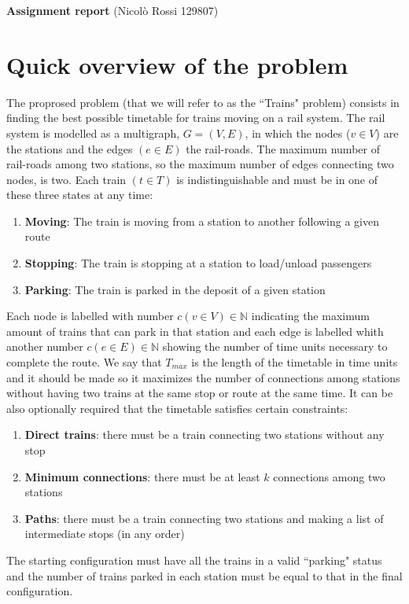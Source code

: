 \documentclass[11pt]{article}
\begin{document}
\newtheorem{Definizione}{Definizione}
\newtheorem{Lemma}{Lemma}
\newtheorem{Teorema}{Teorema}
\textbf{Assignment report} (Nicolò Rossi 129807)
\tableofcontents
\newpage
\section{Quick overview of the problem}
The proprosed problem (that we will refer to as the ``Trains" problem) consists in finding the best possible timetable for trains moving on a rail system. 
The rail system is modelled as a multigraph, $G=(V,E)$, in which the nodes ($v\in V$) are the stations and the edges $(e\in E)$ the rail-roads. The maximum number of rail-roads among two stations, so the maximum number of edges connecting two nodes, is two.
Each train $(t \in T)$ is indistinguishable and must be in one of these three states at any time:
\begin{enumerate}
\item \textbf{Moving}: The train is moving from a station to another following a given route
\item \textbf{Stopping}: The train is stopping at a station to load/unload passengers
\item \textbf{Parking}: The train is parked in the deposit of a given station
\end{enumerate} 
Each node is labelled with number $c(v \in V) \in \mathbb{N}$ indicating the maximum amount of trains that can park in that station and each edge is labelled whith another number $c(e \in E) \in \mathbb{N}$ showing the number of time units necessary to complete the route.
We say that $T_{max}$ is the length of the timetable in time units and it should be 
made so it maximizes the number of connections among stations without having two 
trains at the same stop or route at the same time. 
It can be also optionally required that the timetable satisfies certain constraints:
\begin{enumerate}
\item \textbf{Direct trains}: there must be a train connecting two stations without any stop
\item \textbf{Minimum connections}: there must be at least $k$ connections among two stations
\item \textbf{Paths}: there must be a train connecting two stations and making a list of intermediate stops (in any order)
\end{enumerate} 
The starting configuration must have all the trains in a valid ``parking" status and 
the number of trains parked in each station must be equal to that in 
the final configuration. 
\end{document}
